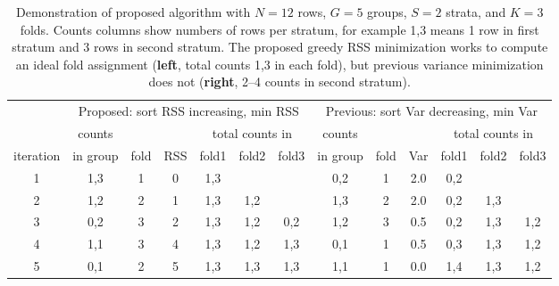 \documentclass[twoside]{article}
\begin{document}
\begin{table}[t]
  \small
  \centering
  \begin{tabular}{c|cccccc|cccccc}
    &\multicolumn{6}{c|}{Proposed: sort RSS increasing, min RSS}&\multicolumn{6}{c}{Previous: sort Var decreasing, min Var}\\
             &counts&     &      &\multicolumn{3}{c|}{total counts in}&counts&&  &\multicolumn{3}{c}{total counts in}\\
    iteration&in group&  fold&   RSS& fold1& fold2& fold3&in group&  fold&   Var& fold1& fold2& fold3\\
    \hline
1&    1,3&     1&     0&   1,3&&&0,2&     1&   2.0&   0,2&&\\
2&    1,2&     2&     1&   1,3&   1,2&&1,3&     2&   2.0&   0,2&   1,3&\\
3&    0,2&     3&     2&   1,3&   1,2&   0,2&1,2&     3&   0.5&   0,2&   1,3&   1,2\\
4&    1,1&     3&     4&   1,3&   1,2&   1,3&0,1&     1&   0.5&   0,3&   1,3&   1,2\\
5&    0,1&     2&     5&   1,3&   1,3&   1,3&1,1&     1&   0.0&   1,4&   1,3&   1,2
  \end{tabular}
  \caption{
    Demonstration of proposed algorithm with $N=12$ rows, $G=5$ groups, $S=2$ strata, and $K=3$ folds.
    Counts columns show numbers of rows per stratum, for example 1,3 means 1 row in first stratum and 3 rows in second stratum.
    The proposed greedy RSS minimization works to compute an ideal fold assignment (\textbf{left}, total counts 1,3 in each fold), but previous variance minimization does not (\textbf{right}, 2--4 counts in second stratum).}
  \label{tab:rss-var}
\end{table}
\end{document}
